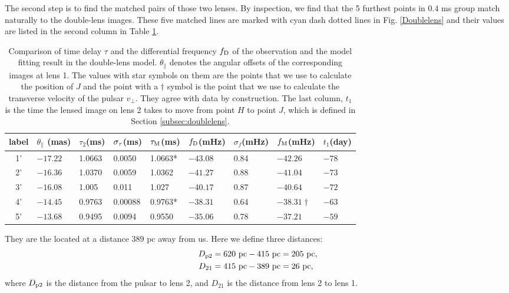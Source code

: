 \documentclass[useAMS,usenatbib]{mn2e}
\begin{document}
The second step is to find the matched pairs of those two lenses.  
By inspection, we find that the 5 furthest points in $0.4$ ms group match naturally to the double-lens images.  These five matched lines are marked with cyan dash dotted lines in Fig. \ref{Doublelens} and their values are listed in the second column in Table \ref{table:double_lens_compare}. 
\begin{table}
\centering
\begin{tabular}{c|llllllll}
\hline
label&$\theta_{\parallel}$ (mas)  & $\tau_2$(ms) & $\sigma_{\rm \tau}$(ms)  & $\tau_{\rm M}$(ms) & $f_{\rm D}$(mHz)  &$\sigma_{f}$(mHz)      &  $f_{\rm M}$(mHz)& $t_1$(day) \\ \hline
1'& $-17.22$  &  1.0663     &0.0050    & 1.0663*        & $-43.08$    &0.84   & $-42.26$           & $-78$\\
 2'& $-16.36$  &    1.0370     &0.0059    & 1.0362       & $-41.27$    & 0.88   & $-41.04$          & $-73$\\ 
3'& $-16.08$  &   1.005    &0.011   & 1.027          & $-40.17$    &   0.87     & $-40.64$          & $-72$\\ 
 4'& $-14.45$  &   0.9763    &0.00088   & 0.9763*       & $-38.31$     &0.64    & $-38.31\dagger$  & $-63$\\ 
5'& $-13.68$  &    0.9495     &0.0094    & 0.9550       & $-35.06$     &0.78    & $-37.21$          &$-59$\\ 
 \hline
\end{tabular}
\caption{Comparison of time delay $\tau$ and the differential
  frequency $f_{\rm D}$ of the observation and the model fitting result in the
  double-lens model.  $\theta_{\parallel}$ denotes the angular offsets
  of the corresponding images at lens 1. 
The values with star symbols on them are the points that we use to
calculate the position of $J$ and the point with a $\dagger$ symbol is
the point that we use to calculate the transverse velocity of the
pulsar $v_{\bot}$.  They agree with data by construction.  The last
column, $t_1$ is the time the lensed image on lens 2 takes to move
from point $H$ to point $J$, which is defined in Section
\ref{subsec:doublelens}.} 
\label{table:double_lens_compare}
\end{table}
They are the located at a distance $389$ pc away from us. Here we define three distances:
\begin{equation}
\begin{aligned}
D_{\rm p2}&=620~{\rm pc}-415~{\rm pc} =205~{\rm pc},\\
D_{21}&=415~{\rm pc}-389~{\rm pc} =26~{\rm pc},
\end{aligned} 
\end{equation}
where $D_{\rm p2}$ is the distance from the pulsar to lens 2, and $D_{21}$ is the distance from lens 2 to lens 1.
\end{document}
